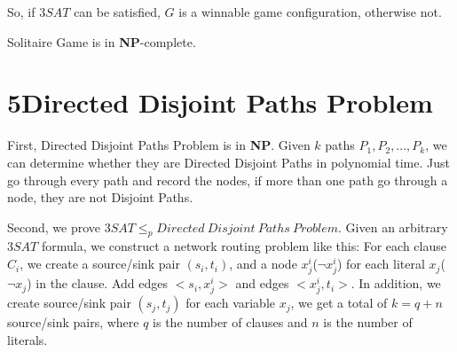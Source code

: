 \documentclass[a4paper,12pt]{article}
\begin{document}
So, if $3SAT$ can be satisfied, $G$ is a winnable game configuration, otherwise not.

Solitaire Game is in \textbf{NP}-complete.

\section*{5\quad Directed Disjoint Paths Problem}
First, Directed Disjoint Paths Problem is in \textbf{NP}. Given $k$ paths $P_1,P_2,...,P_k$, we can determine whether they are Directed Disjoint Paths in polynomial time. Just go through every path and record the nodes, if more than one path go through a node, they are not Disjoint Paths.

Second, we prove $3SAT\leq_p Directed~Disjoint~Paths~Problem$. Given an arbitrary $3SAT$ formula, we construct a network routing problem like this: For each clause $C_i$, we create a source/sink pair $(s_i,t_i)$, and a node $x^i_j$($\lnot x^i_j$) for each literal $x_j$($\lnot x_j$) in the clause. Add edges $<s_i,x^i_j>$ and edges $<x^i_j,t_i>$. In addition, we create source/sink pair $(s_j,t_j)$ for each variable $x_j$, we get a total of $k=q+n$ source/sink pairs, where $q$ is the number of clauses and $n$ is the number of literals.
\end{document}
